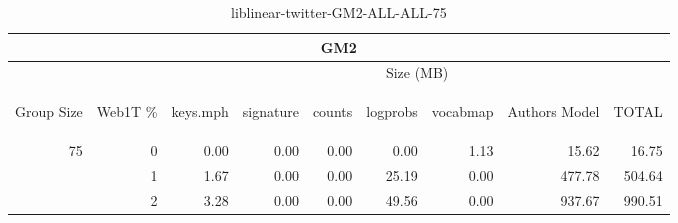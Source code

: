 \begin{center}
\begin{table}[htbp]
\begin{tabular}{ | r | r | r | r | r | r | r | r | r |}
\hline
\multicolumn{9}{|c|}{GM2}\\
\hline
 & & \multicolumn{7}{|c|}{Size (MB)}\\ \cline{3-9}
\begin{sideways}Group Size\end{sideways} & \begin{sideways}Web1T \% \end{sideways} & \begin{sideways}keys.mph\end{sideways} & \begin{sideways}signature\end{sideways} & \begin{sideways}counts\end{sideways} & \begin{sideways}logprobs\end{sideways} & \begin{sideways}vocabmap\end{sideways} & \begin{sideways}Authors Model \end{sideways} & \begin{sideways}TOTAL\end{sideways}\\
\hline
\multirow{2}{*}{75}
 & 0 & 0.00 & 0.00 & 0.00 & 0.00 & 1.13 & 15.62 & 16.75\\ \cline{2-9}
 & 1 & 1.67 & 0.00 & 0.00 & 25.19 & 0.00 & 477.78 & 504.64\\ \cline{2-9}
 & 2 & 3.28 & 0.00 & 0.00 & 49.56 & 0.00 & 937.67 & 990.51\\ \cline{2-9}
\hline
\end{tabular}
\caption{liblinear-twitter-GM2-ALL-ALL-75}
\label{table:liblinear-twitter-GM2-ALL-ALL-75}
\end{table}
\end{center}

